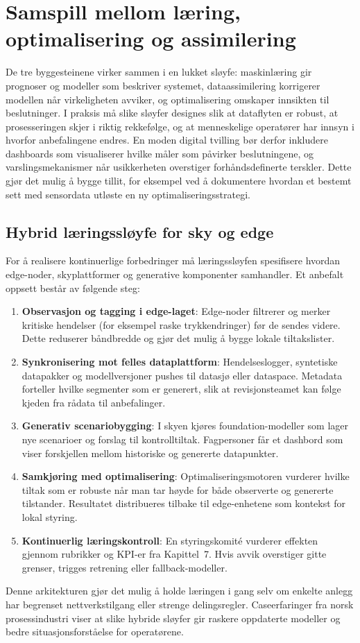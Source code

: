\section{Samspill mellom læring, optimalisering og assimilering}
De tre byggesteinene virker sammen i en lukket sløyfe: maskinlæring gir prognoser og modeller som beskriver systemet, dataassimilering korrigerer modellen når virkeligheten avviker, og optimalisering omskaper innsikten til beslutninger. I praksis må slike sløyfer designes slik at dataflyten er robust, at prosesseringen skjer i riktig rekkefølge, og at menneskelige operatører har innsyn i hvorfor anbefalingene endres. En moden digital tvilling bør derfor inkludere dashboards som visualiserer hvilke måler som påvirker beslutningene, og varslingsmekanismer når usikkerheten overstiger forhåndsdefinerte terskler. Dette gjør det mulig å bygge tillit, for eksempel ved å dokumentere hvordan et bestemt sett med sensordata utløste en ny optimaliseringsstrategi.

\subsection{Hybrid læringssløyfe for sky og edge}
For å realisere kontinuerlige forbedringer må læringssløyfen spesifisere hvordan edge-noder, skyplattformer og generative komponenter samhandler. Et anbefalt oppsett består av følgende steg:
\begin{enumerate}
    \item \textbf{Observasjon og tagging i edge-laget}: Edge-noder filtrerer og merker kritiske hendelser (for eksempel raske trykkendringer) før de sendes videre. Dette reduserer båndbredde og gjør det mulig å bygge lokale tiltakslister.
    \item \textbf{Synkronisering mot felles dataplattform}: Hendelseslogger, syntetiske datapakker og modellversjoner pushes til datasjø eller dataspace. Metadata forteller hvilke segmenter som er generert, slik at revisjonsteamet kan følge kjeden fra rådata til anbefalinger.
    \item \textbf{Generativ scenariobygging}: I skyen kjøres foundation-modeller som lager nye scenarioer og forslag til kontrolltiltak. Fagpersoner får et dashbord som viser forskjellen mellom historiske og genererte datapunkter.
    \item \textbf{Samkjøring med optimalisering}: Optimaliseringsmotoren vurderer hvilke tiltak som er robuste når man tar høyde for både observerte og genererte tilstander. Resultatet distribueres tilbake til edge-enhetene som kontekst for lokal styring.
    \item \textbf{Kontinuerlig læringskontroll}: En styringskomité vurderer effekten gjennom rubrikker og KPI-er fra Kapittel~7. Hvis avvik overstiger gitte grenser, trigges retrening eller fallback-modeller.
\end{enumerate}
Denne arkitekturen gjør det mulig å holde læringen i gang selv om enkelte anlegg har begrenset nettverkstilgang eller strenge delingsregler. Caseerfaringer fra norsk prosessindustri viser at slike hybride sløyfer gir raskere oppdaterte modeller og bedre situasjonsforståelse for operatørene.\citep{kongsberg2023kognitwin}

